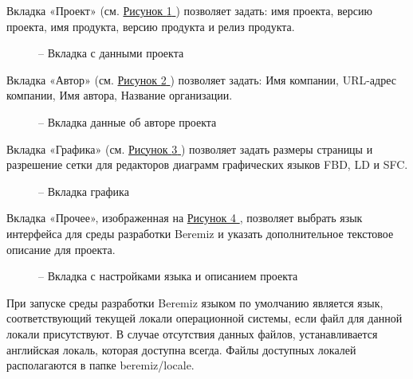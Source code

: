\documentclass[letterpaper,10pt,russian]{sphinxmanual}
\begin{document}
Вкладка «Проект» (см. \hyperref[usage_guide/ide_components:image44]{Рисунок \ref{usage_guide/ide_components:image44} }) позволяет задать: имя проекта, версию
проекта, имя продукта, версию продукта и релиз продукта.
\begin{figure}[htbp]
\centering
\capstart

\noindent{}
\caption{– Вкладка с данными проекта}\label{usage_guide/ide_components:image44}\end{figure}

Вкладка «Автор» (см. \hyperref[usage_guide/ide_components:image45]{Рисунок \ref{usage_guide/ide_components:image45} }) позволяет задать: Имя компании, URL-адрес
компании, Имя автора, Название организации.
\begin{figure}[htbp]
\centering
\capstart

\noindent{}
\caption{– Вкладка данные об авторе проекта}\label{usage_guide/ide_components:image45}\end{figure}

Вкладка «Графика» (см. \hyperref[usage_guide/ide_components:image46]{Рисунок \ref{usage_guide/ide_components:image46} }) позволяет задать размеры страницы и
разрешение сетки для редакторов диаграмм графических языков FBD, LD и
SFC.
\begin{figure}[htbp]
\centering
\capstart

\noindent{}
\caption{– Вкладка графика}\label{usage_guide/ide_components:image46}\end{figure}

Вкладка «Прочее», изображенная на \hyperref[usage_guide/ide_components:image47]{Рисунок \ref{usage_guide/ide_components:image47} }, позволяет выбрать язык
интерфейса для среды разработки Beremiz и указать дополнительное
текстовое описание для проекта.
\begin{figure}[htbp]
\centering
\capstart

\noindent{}
\caption{– Вкладка с настройками языка и описанием проекта}\label{usage_guide/ide_components:image47}\end{figure}

При запуске среды разработки Beremiz языком по умолчанию является язык,
соответствующий текущей локали операционной системы, если файл для
данной локали присутствуют. В случае отсутствия данных файлов,
устанавливается английская локаль, которая доступна всегда. Файлы
доступных локалей располагаются в папке beremiz/locale.
\end{document}
